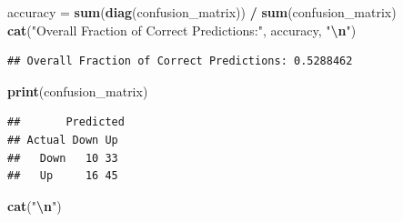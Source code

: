 \documentclass[
]{article}
\newenvironment{Shaded}{\begin{snugshade}}{\end{snugshade}}
\newcommand{\AttributeTok}[1]{\textcolor[rgb]{0.13,0.29,0.53}{#1}}
\newcommand{\CommentTok}[1]{\textcolor[rgb]{0.56,0.35,0.01}{\textit{#1}}}
\newcommand{\FunctionTok}[1]{\textcolor[rgb]{0.13,0.29,0.53}{\textbf{#1}}}
\newcommand{\NormalTok}[1]{#1}
\newcommand{\OtherTok}[1]{\textcolor[rgb]{0.56,0.35,0.01}{#1}}
\newcommand{\SpecialCharTok}[1]{\textcolor[rgb]{0.81,0.36,0.00}{\textbf{#1}}}
\newcommand{\StringTok}[1]{\textcolor[rgb]{0.31,0.60,0.02}{#1}}
\begin{document}
\begin{Shaded}
\begin{Highlighting}[]
\NormalTok{accuracy }\OtherTok{=} \FunctionTok{sum}\NormalTok{(}\FunctionTok{diag}\NormalTok{(confusion\_matrix)) }\SpecialCharTok{/} \FunctionTok{sum}\NormalTok{(confusion\_matrix)}
\FunctionTok{cat}\NormalTok{(}\StringTok{"Overall Fraction of Correct Predictions:"}\NormalTok{, accuracy, }\StringTok{"}\SpecialCharTok{\textbackslash{}n}\StringTok{"}\NormalTok{)}
\end{Highlighting}
\end{Shaded}

\begin{verbatim}
## Overall Fraction of Correct Predictions: 0.5288462
\end{verbatim}

\begin{Shaded}
\begin{Highlighting}[]
\FunctionTok{print}\NormalTok{(confusion\_matrix)}
\end{Highlighting}
\end{Shaded}

\begin{verbatim}
##       Predicted
## Actual Down Up
##   Down   10 33
##   Up     16 45
\end{verbatim}

\begin{Shaded}
\begin{Highlighting}[]
\FunctionTok{cat}\NormalTok{(}\StringTok{"}\SpecialCharTok{\textbackslash{}n}\StringTok{"}\NormalTok{)}
\end{Highlighting}
\end{Shaded}

\begin{Shaded}
\end{Shaded}
\end{document}

